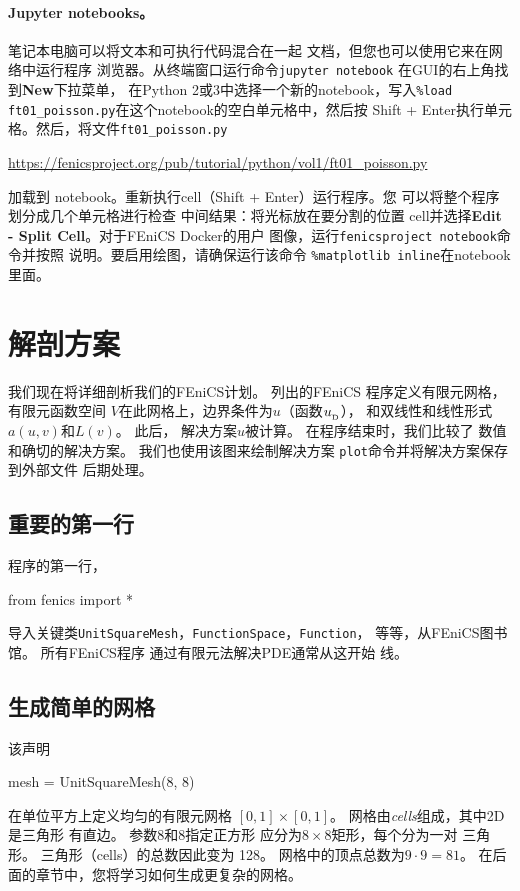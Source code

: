 \paragraph{Jupyter notebooks。}

笔记本电脑可以将文本和可执行代码混合在一起
文档，但您也可以使用它来在网络中运行程序
浏览器。从终端窗口运行命令\texttt{jupyter notebook}
在GUI的右上角找到\textbf{New}下拉菜单，
在Python 2或3中选择一个新的notebook，写入\verb!%load ft01_poisson.py!在这个notebook的空白单元格中，然后按
Shift + Enter执行单元格。然后，将文件\nolinkurl{ft01_poisson.py}
\begin{center}
  \url{https://fenicsproject.org/pub/tutorial/python/vol1/ft01_poisson.py}
\end{center}
加载到
notebook。重新执行cell（Shift + Enter）运行程序。您
可以将整个程序划分成几个单元格进行检查
中间结果：将光标放在要分割的位置
cell并选择\textbf{Edit - Split Cell}。对于FEniCS Docker的用户
图像，运行\texttt{fenicsproject notebook}命令并按照
说明。要启用绘图，请确保运行该命令
\verb!%matplotlib inline!在notebook里面。

\section{解剖方案}
\label{ch:poisson0:impl:dissect}
我们现在将详细剖析我们的FEniCS计划。 列出的FEniCS
程序定义有限元网格，有限元函数空间
$V$在此网格上，边界条件为$u$（函数$\ub$），
和双线性和线性形式$a(u,v)$和$L(v)$。 此后，
解决方案$u$被计算。 在程序结束时，我们比较了
数值和确切的解决方案。 我们也使用该图来绘制解决方案
\texttt{plot}命令并将解决方案保存到外部文件
后期处理。

\subsection{重要的第一行}
程序的第一行，
\begin{bash}
from fenics import *
\end{bash}
导入关键类\texttt{UnitSquareMesh}，\texttt{FunctionSpace}，\texttt{Function}，
等等，从FEniCS图书馆。 所有FEniCS程序
通过有限元法解决PDE通常从这开始
线。


\subsection{生成简单的网格}
该声明
\begin{bash}
mesh = UnitSquareMesh(8, 8)
\end{bash}
在单位平方上定义均匀的有限元网格
$[0,1]\times [0,1]$。 网格由\emph{cells}组成，其中2D是三角形
有直边。 参数8和8指定正方形
应分为$8\times 8$矩形，每个分为一对
三角形。 三角形（cells）的总数因此变为
128。 网格中的顶点总数为$9\cdot 9=81$。
在后面的章节中，您将学习如何生成更复杂的网格。

